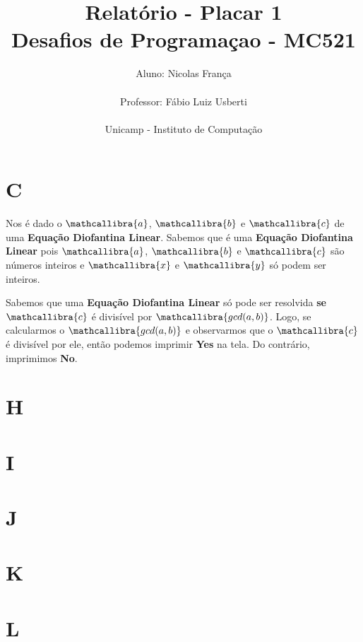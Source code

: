 \documentclass[a4paper,11pt,fleqn]{article}
\title{Relatório - Placar 1\\
Desafios de Programaçao - MC521}
\author{Aluno: Nicolas França\\\\
Professor: Fábio Luiz Usberti\\\\
Unicamp - Instituto de Computação\\}
\date{}
\begin{document}
\maketitle

\section{C}
\label{s:c}

Nos é dado o $\mathcallibra{a}$, $\mathcallibra{b}$ e $\mathcallibra{c}$ de uma 
  \textbf{Equação Diofantina Linear}. Sabemos que é uma \textbf{Equação Diofantina Linear} pois $\mathcallibra{a}$, $\mathcallibra{b}$ e 
  $\mathcallibra{c}$ são números inteiros e $\mathcallibra{x}$ e $\mathcallibra{y}$ só
  podem ser inteiros.

Sabemos que uma \textbf{Equação Diofantina Linear} só pode ser resolvida \textbf{se}
  $\mathcallibra{c}$ é divisível por $\mathcallibra{gcd(a, b)}$. Logo, se calcularmos
  o $\mathcallibra{gcd(a, b)}$ e observarmos que o $\mathcallibra{c}$ é divisível por ele,
  então podemos imprimir \textbf{Yes} na tela. Do contrário, imprimimos \textbf{No}.


\section{H}
\label{s:h}


\section{I}
\label{s:i}


\section{J}
\label{s:j}


\section{K}
\label{s:k}


\section{L}
\label{s:l}




\end{document}
